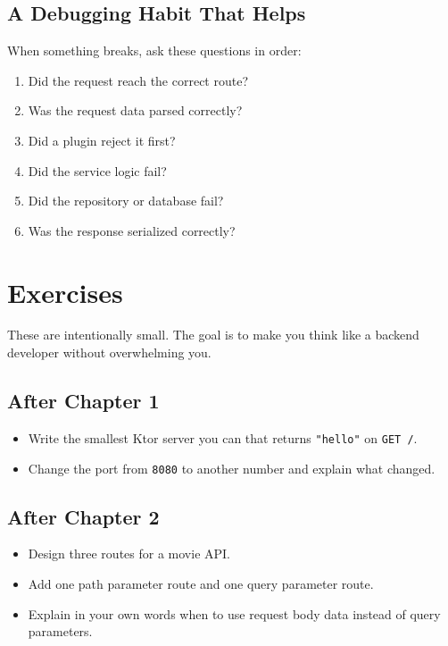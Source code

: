 \documentclass[11pt,a4paper]{article}
\begin{document}
\subsection{A Debugging Habit That Helps}

When something breaks, ask these questions in order:
\begin{enumerate}
    \item Did the request reach the correct route?
    \item Was the request data parsed correctly?
    \item Did a plugin reject it first?
    \item Did the service logic fail?
    \item Did the repository or database fail?
    \item Was the response serialized correctly?
\end{enumerate}

\section{Exercises}

These are intentionally small. The goal is to make you think like a backend developer without overwhelming you.

\subsection{After Chapter 1}

\begin{itemize}
    \item Write the smallest Ktor server you can that returns \texttt{"hello"} on \texttt{GET /}.
    \item Change the port from \texttt{8080} to another number and explain what changed.
\end{itemize}

\subsection{After Chapter 2}

\begin{itemize}
    \item Design three routes for a movie API.
    \item Add one path parameter route and one query parameter route.
    \item Explain in your own words when to use request body data instead of query parameters.
\end{itemize}
\end{document}
